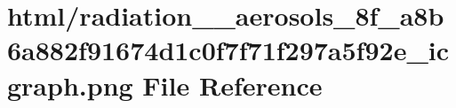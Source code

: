\hypertarget{radiation____aerosols__8f__a8b6a882f91674d1c0f7f71f297a5f92e__icgraph_8png}{}\section{html/radiation\+\_\+\+\_\+aerosols\+\_\+8f\+\_\+a8b6a882f91674d1c0f7f71f297a5f92e\+\_\+icgraph.png File Reference}
\label{radiation____aerosols__8f__a8b6a882f91674d1c0f7f71f297a5f92e__icgraph_8png}
